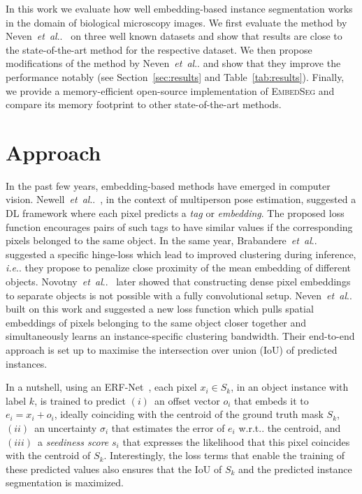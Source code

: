 \documentclass{midl}
\makeatletter
\newcommand{\EmbedSeg}{\mbox{\textsc{EmbedSeg}}\xspace}
\newcommand{\miniheadline}[1]{\noindent\textbf{#1.}}
\DeclareRobustCommand\onedot{\futurelet\@let@token\@onedot}
\def\@onedot{\ifx\@let@token.\else.\null\fi\xspace}
\def\ie{\emph{i.e}\onedot} \def\Ie{\emph{I.e}\onedot}
\def\wrt{w.r.t\onedot}
\def\etal{\emph{et~al}\onedot}
\makeatother
\begin{document}
In this work we evaluate how well embedding-based instance segmentation works in the domain of biological microscopy images.
We first evaluate the method by Neven~\etal~\cite{neven2019} on three well known datasets and show that results are close to the state-of-the-art method for the respective dataset.
We then propose modifications of the method by Neven~\etal and show that they improve the performance notably (see Section~\ref{sec:results} and Table~\ref{tab:results}).
Finally, we provide a memory-efficient open-source implementation of \EmbedSeg and compare its memory footprint to other state-of-the-art methods.


\section{Approach}
\label{sec:method}
\resultsFinal
\ablationResults
\vspace{-2.5mm}
In the past few years, embedding-based methods have emerged in computer vision.
Newell~\etal~\cite{newell2017}, in the context of multiperson pose estimation, suggested a DL framework where each pixel predicts a \emph{tag} or \textit{embedding}. 
The proposed loss function encourages pairs of such tags to have similar values if the corresponding pixels belonged to the same object.
In the same year, Brabandere~\etal~\cite{brabandere2017} suggested a specific hinge-loss which lead to improved clustering during inference, \ie they propose to penalize close proximity of the mean embedding of different objects. 
Novotny~\etal~\cite{novotny2018} later showed that constructing dense pixel embeddings to separate objects is not possible with a fully convolutional setup.
Neven~\etal~\cite{neven2019} built on this work and suggested a new loss function which pulls spatial embeddings of pixels belonging to the same object closer together and simultaneously learns an instance-specific clustering bandwidth.
Their end-to-end approach is set up to maximise the intersection over union (IoU) of predicted instances.

In a nutshell, using an ERF-Net~\cite{romera2018}, each pixel $x_i\in S_k$, in an object instance with label $k$, is trained to predict
$(i)$~an offset vector $o_i$ that embeds it to $e_i = x_i + o_i$, ideally coinciding with the centroid of the ground truth mask $S_k$,
$(ii)$~an uncertainty $\sigma_i$ that estimates the error of $e_i$ \wrt the centroid, and
$(iii)$~a \textit{seediness score} $s_i$ that expresses the likelihood that this pixel coincides with the centroid of $S_k$.
Interestingly, the loss terms that enable the training of these predicted values also ensures that the IoU of $S_k$ and the predicted instance segmentation is maximized.
\end{document}
